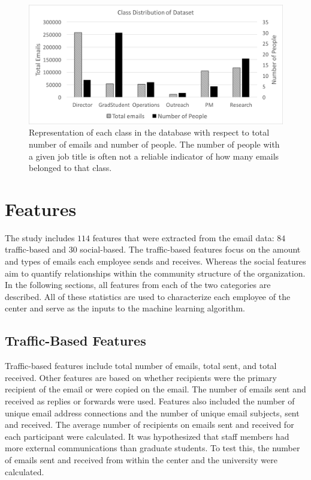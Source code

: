 \documentclass[10pt,twocolumn,conference]{IEEEtran}
\begin{document}
\begin{figure}[t]
	\centering
	\includegraphics[width=\columnwidth,trim={1mm 5mm 1mm 5mm},clip]{DatasetStatsBar_BW}
    \vspace{-17pt}
	\caption{Representation of each class in the database with respect to total number of emails and number of people.  The number of people with a given job title is often not a reliable indicator of how many emails belonged to that class.}
	\vspace{-15pt}
	\label{fig:db_bar}
\end{figure}


\section{Features} \label{Features}
The study includes $114$ features that were extracted from the email data: $84$ traffic-based and $30$ social-based.
The traffic-based features focus on the amount and types of emails each employee sends and receives.
Whereas the social features aim to quantify relationships within the community structure of the organization.
In the following sections, all features from each of the two categories are described. 
All of these statistics are used to characterize each employee of the center and serve as the inputs to the machine learning algorithm.

\subsection{Traffic-Based Features}
Traffic-based features include total number of emails, total sent, and total received.
Other features are based on whether recipients were the primary recipient of the email or were copied on the email.
The number of emails sent and received as replies or forwards were used.
Features also included the number of unique email address connections and the number of unique email subjects, sent and received.
The average number of recipients on emails sent and received for each participant were calculated.
It was hypothesized that staff members had more external communications than graduate students.
To test this, the number of emails sent and received from within the center and the university were calculated.  
\end{document}
